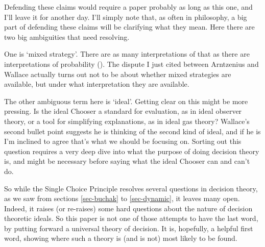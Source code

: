 \documentclass[
  11pt,
  letterpaper,
  DIV=11,
  numbers=noendperiod,
  twoside]{scrartcl}
\begin{document}
Defending these claims would require a paper probably as long as this
one, and I'll leave it for another day. I'll simply note that, as often
in philosophy, a big part of defending these claims will be clarifying
what they mean. Here there are two big ambiguities that need resolving.

One is `mixed strategy'. There are as many interpretations of that as
there are interpretations of probability
(). The dispute I
just cited between Arntzenius and Wallace actually turns out not to be
about whether mixed strategies are available, but under what
interpretation they are available.

The other ambiguous term here is `ideal'. Getting clear on this might be
more pressing. Is the ideal Chooser a standard for evaluation, as in
ideal observer theory, or a tool for simplifying explanations, as in
ideal gas theory? Wallace's second bullet point suggests he is thinking
of the second kind of ideal, and if he is I'm inclined to agree that's
what we should be focusing on. Sorting out this question requires a very
deep dive into what the purpose of doing decision theory is, and might
be necessary before saying what the ideal Chooser can and can't do.

So while the Single Choice Principle resolves several questions in
decision theory, as we saw from sections \ref{sec-buchak} to
\ref{sec-dynamic}, it leaves many open. Indeed, it raises (or re-raises)
some hard questions about the nature of decision theoretic ideals. So
this paper is not one of those attempts to have the last word, by
putting forward a universal theory of decision. It is, hopefully, a
helpful first word, showing where such a theory is (and is not) most
likely to be found.
\end{document}

